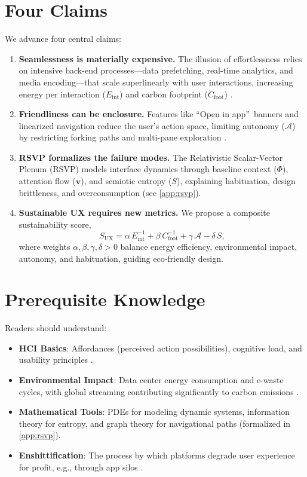 \documentclass[openany]{book}
\newcommand{\PhiS}{\Phi} %
\newcommand{\vvec}{\mathbf{v}} %
\newcommand{\Sent}{S} %
\newcommand{\Eint}{E_{\mathrm{int}}} %
\newcommand{\Cfoot}{C_{\mathrm{foot}}} %
\newcommand{\Auton}{\mathcal{A}} %
\newcommand{\SUX}{S_{\mathrm{UX}}} %
\begin{document}
\section{Four Claims}
\label{sec:intro-claims}
We advance four central claims:
\begin{enumerate}[label=\textbf{C\arabic*}.]
  \item \textbf{Seamlessness is materially expensive.} The illusion of effortlessness relies on intensive back-end processes---data prefetching, real-time analytics, and media encoding---that scale superlinearly with user interactions, increasing energy per interaction (\(\Eint\)) and carbon footprint (\(\Cfoot\)) \citep{extentia2024}.
  \item \textbf{Friendliness can be enclosure.} Features like \textquotedblleft Open in app\textquotedblright\ banners and linearized navigation reduce the user’s action space, limiting autonomy (\(\Auton\)) by restricting forking paths and multi-pane exploration \citep{doctorow2022}.
  \item \textbf{RSVP formalizes the failure modes.} The Relativistic Scalar-Vector Plenum (RSVP) models interface dynamics through baseline context (\(\PhiS\)), attention flow (\(\vvec\)), and semiotic entropy (\(\Sent\)), explaining habituation, design brittleness, and overconsumption (see \cref{app:rsvp}).
  \item \textbf{Sustainable UX requires new metrics.} We propose a composite sustainability score,
  \begin{equation}
  \label{eq:intro-SUX}
  \SUX = \alpha\,\Eint^{-1} + \beta\,\Cfoot^{-1} + \gamma\,\Auton - \delta\,\Sent,
  \end{equation}
  where weights \(\alpha, \beta, \gamma, \delta > 0\) balance energy efficiency, environmental impact, autonomy, and habituation, guiding eco-friendly design.
\end{enumerate}

\section{Prerequisite Knowledge}
Readers should understand:
\begin{itemize}
  \item \textbf{HCI Basics}: Affordances (perceived action possibilities), cognitive load, and usability principles \citep{norman1988}.
  \item \textbf{Environmental Impact}: Data center energy consumption and e-waste cycles, with global streaming contributing significantly to carbon emissions \citep{extentia2024}.
  \item \textbf{Mathematical Tools}: PDEs for modeling dynamic systems, information theory for entropy, and graph theory for navigational paths (formalized in \cref{app:rsvp}).
  \item \textbf{Enshittification}: The process by which platforms degrade user experience for profit, e.g., through app silos \citep{doctorow2022}.
\end{itemize}
\end{document}
